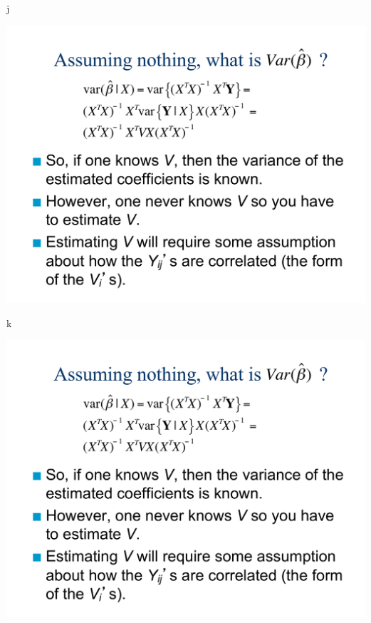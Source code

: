 \documentclass[ignorenonframetext,]{beamer}
\begin{document}
\begin{frame}{j}

\includegraphics[page=11,width=5.5in]{Chapter5AddSlides1.pdf}

\end{frame}

\begin{frame}{k}

\includegraphics[page=12,width=5.5in]{Chapter5AddSlides1.pdf}

\end{frame}
\end{document}
